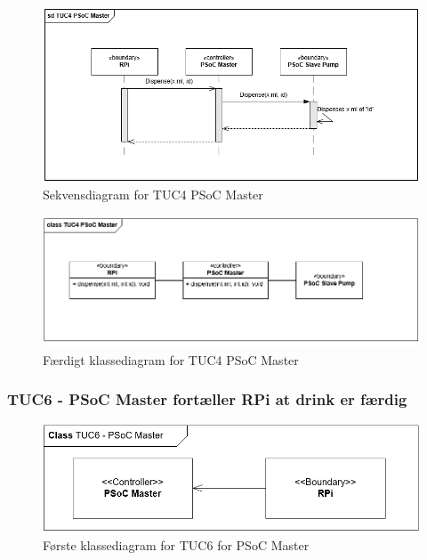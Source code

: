 \begin{figure}[H]
	\centering
	\includegraphics[width=1\textwidth]{Images/Applikationsmodeller/PSoCMaster/TUC4_sd_PSoC_Master.png}
	\caption{Sekvensdiagram for TUC4 PSoC Master}
	\label{fig:sdTUC3PSoCMaster}
\end{figure}
\begin{figure}[H]
	\centering
	\includegraphics[width=1\textwidth]{Images/Applikationsmodeller/PSoCMaster/TUC4_cd_PSoC_Master_final.png}
	\caption{Færdigt klassediagram for TUC4 PSoC Master}
	\label{fig:cdTUC4PSoCMaster_final}
\end{figure}

\subsubsection{TUC6 - PSoC Master fortæller RPi at drink er færdig}
\begin{figure}[H]
	\centering
	\includegraphics[width=1\textwidth]{Images/Applikationsmodeller/PSoCMaster/class1.png}
	\caption{Første klassediagram for TUC6 for PSoC Master}
	\label{fig:cdTUC6PSoCMaster_first}
\end{figure}

